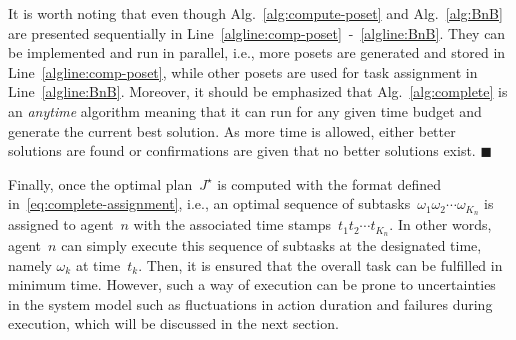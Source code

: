\begin{remark}\label{remark:parallel}
It is worth noting that even though Alg.~\ref{alg:compute-poset} and
Alg.~\ref{alg:BnB} are presented sequentially in
Line~\ref{algline:comp-poset}~-~\ref{algline:BnB}.
They can be implemented and run {in parallel}, i.e., more posets are
generated and stored in Line~\ref{algline:comp-poset},
while other posets are used for task assignment in Line~\ref{algline:BnB}.
Moreover, it should be emphasized that Alg.~\ref{alg:complete} is an \emph{anytime}
algorithm meaning that it can run for any given time budget and generate the
current best solution.
As more time is allowed, either better solutions are found or confirmations are
given that no better solutions exist.
\hfill  $\blacksquare$
\end{remark}




Finally, once the optimal plan~$J^\star$ is computed with the format
defined in~\eqref{eq:complete-assignment}, i.e.,
an optimal sequence of subtasks~$\omega_1\omega_2\cdots\omega_{K_n}$ is assigned
to agent~$n$ with the associated time stamps~$t_1t_2\cdots t_{K_n}$.
In other words,
agent~$n$ can simply execute this sequence of subtasks at the designated time,
namely $\omega_k$ at time~$t_k$.
Then, it is ensured that the overall task can be fulfilled in minimum time.
However, such a way of execution can be prone to uncertainties in the system
model such as fluctuations in action duration
and failures during execution, which will be discussed in the next section.
